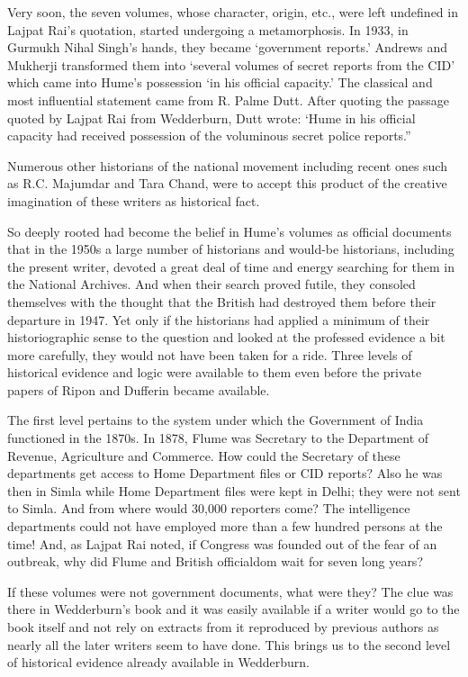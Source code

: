 Very soon, the seven volumes, whose character, origin, etc., were left undefined in Lajpat Rai’s quotation, started undergoing a metamorphosis. In 1933, in Gurmukh Nihal Singh’s hands, they became ‘government reports.’ Andrews and Mukherji transformed them into ‘several volumes of secret reports from the CID’ which came into Hume’s possession ‘in his official capacity.’ The classical and most influential statement came from R. Palme Dutt. After quoting the passage quoted by Lajpat Rai from Wedderburn, Dutt wrote: ‘Hume in his official capacity had received possession of the voluminous secret police reports.”

Numerous other historians of the national movement including recent ones such as R.C. Majumdar and Tara Chand, were to accept this product of the creative imagination of these writers as historical fact.

So deeply rooted had become the belief in Hume’s volumes as official documents that in the 1950s a large number of historians and would-be historians, including the present writer, devoted a great deal of time and energy searching for them in the National Archives. And when their search proved futile, they consoled themselves with the thought that the British had destroyed them before their departure in 1947. Yet only if the historians had applied a minimum of their historiographic sense to the question and looked at the professed evidence a bit more carefully, they would not have been taken for a ride. Three levels of historical evidence and logic were available to them even before the private papers of Ripon and Dufferin became available.

The first level pertains to the system under which the Government of India functioned in the 1870s. In 1878, Flume was Secretary to the Department of Revenue, Agriculture and Commerce. How could the Secretary of these departments get access to Home Department files or CID reports? Also he was then in Simla while Home Department files were kept in Delhi; they were not sent to Simla. And from where would 30,000 reporters come? The intelligence departments could not have employed more than a few hundred persons at the time! And, as Lajpat Rai noted, if Congress was founded out of the fear of an outbreak, why did Flume and British officialdom wait for seven long years?

If these volumes were not government documents, what were they? The clue was there in Wedderburn’s book and it was easily available if a writer would go to the book itself and not rely on extracts from it reproduced by previous authors as nearly all the later writers seem to have done. This brings us to the second level of historical evidence already available in Wedderburn.

